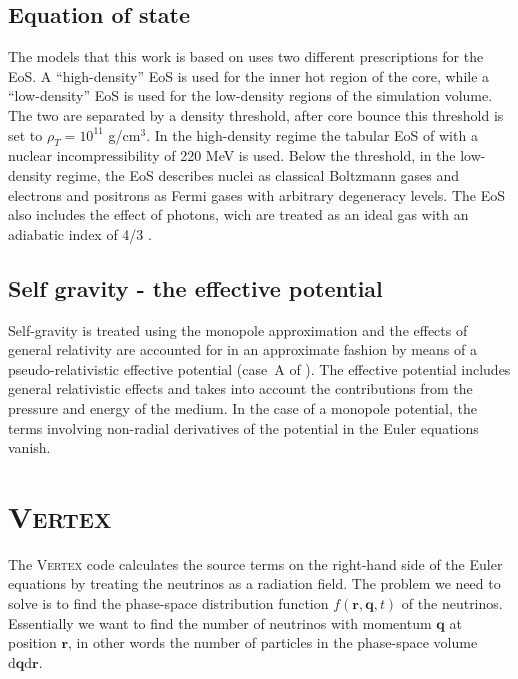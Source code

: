 \subsection{Equation of state}
The models that this work is based on uses two different prescriptions
for the EoS. A ``high-density'' EoS is used for the inner
hot region of the core, while a ``low-density'' EoS is used for the low-density regions of the simulation volume. The two are separated by a density threshold,
after core bounce this threshold is set to $\rho_T = 10^{11}$ g/cm$^3$.
In the high-density regime the tabular EoS of 
\cite{lattimer_91} with a nuclear incompressibility of 220 MeV is used. 
Below the threshold, in the low-density regime, the EoS describes nuclei as
classical Boltzmann gases and electrons and positrons as Fermi gases with arbitrary degeneracy levels. 
The EoS also includes the effect of photons, wich are treated as an ideal gas with an adiabatic index of 4/3 \citep{janka_99}.

\subsection{Self gravity - the effective potential}
Self-gravity is treated using the monopole                      
approximation and the effects of general relativity are accounted for                                               
in an approximate fashion by means of a pseudo-relativistic                                                          
effective potential (case~A of \cite{marek_06}). 
The effective potential includes general relativistic effects and
takes into account the contributions from the pressure and energy of the medium.
In the case of a monopole potential, the terms involving
non-radial derivatives of the potential in the Euler equations vanish.

\section{\textsc{Vertex}}
The \textsc{Vertex} code calculates the source terms on the right-hand side of the
Euler equations by treating the neutrinos as a radiation field. 
The problem we need to solve is to find the phase-space distribution function $f(\mathbf{r},\mathbf{q},t)$ of the neutrinos.
Essentially we want to find the number of neutrinos with momentum $\mathbf{q}$ at position $\mathbf{r}$, in other
words the number of particles in the phase-space volume $\mathrm{d} \mathbf{q} \mathrm{d} \mathbf{r}$.

